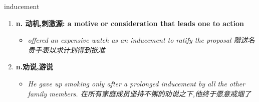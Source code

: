 
\begin{frame}
{\huge inducement}
\begin{center}
\begin{enumerate}\Large
  \item \textbf{n. 动机,刺激源: a motive or consideration that leads one to action}
  \begin{itemize}
    \item \em{\Large{offered an expensive watch as an inducement to ratify the proposal 赠送名贵手表以求计划得到批准}}
  \end{itemize}
  \item \textbf{n.劝说,游说}
  \begin{itemize}
    \item \em{\Large{He gave up smoking only after a prolonged inducement by all the other family members. 在所有家庭成员坚持不懈的劝说之下,他终于愿意戒烟了}}
  \end{itemize}
\end{enumerate}
\end{center}
\end{frame}

